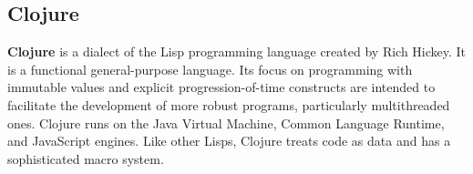 \subsection{Clojure}
{\bfseries Clojure} is a dialect of the Lisp programming language created by Rich Hickey. It is a functional general-purpose language. Its focus on programming with immutable values and explicit progression-of-time constructs are intended to facilitate the development of more robust programs, particularly multithreaded ones.
Clojure runs on the Java Virtual Machine, Common Language Runtime, and JavaScript engines. Like other Lisps, Clojure treats code as data and has a sophisticated macro system.  

